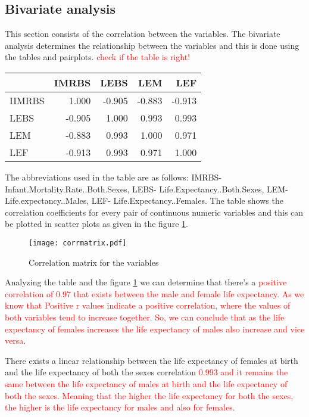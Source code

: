 \documentclass[12 pt]{scrartcl}
\newcommand{\red}{\textcolor{red}}
\begin{document}
	\subsection{Bivariate analysis}
	
	This section consists of the correlation between the variables. The bivariate analysis determines the relationship between the variables and this is done using the tables and pairplots.
	\red{ check if the table is right!}
	\begin{table}[ht]
		\centering
		\label{tab:corr_matrix}
		\begin{tabular}{l|rrrr}
			{} &  IMRBS &  LEBS & LEM &  LEF \\
			\hline
			IIMRBS &       1.000 &   -0.905 &   -0.883 &   -0.913 \\
			LEBS   &      -0.905 &    1.000 &    0.993 &   0.993 \\
			LEM    &      -0.883 &    0.993 &    1.000 &    0.971 \\
			LEF    &      -0.913 &    0.993 &    0.971 &   1.000 \\
			
		\end{tabular}
	\end{table}
	
	The abbreviations used in the table are as follows: IMRBS- Infant.Mortality.Rate..Both.Sexes, LEBS- Life.Expectancy..Both.Sexes, LEM- Life.expectancy..Males, LEF- Life.Expectancy..Females. The table  shows the correlation coefficients for every pair of continuous numeric variables and this can be plotted in scatter plots as given in the figure \ref{fig:pairplot}.
	
	\begin{figure}[h!]
		\centering
		\texttt{[image: corrmatrix.pdf]}
		\caption{Correlation matrix for the variables}
		\label{fig:pairplot}
	\end{figure}
	
	Analyzing the table  and the figure \ref{fig:pairplot} 
	we can determine that there's a \red{positive correlation of 0.97 that exists between the male and female life expectancy. As we know that Positive r values indicate a positive correlation, where the values of both variables tend to increase together. So, we can conclude that as the life expectancy of females increases the life expectancy of males also increase and vice versa}. 
	
	There exists a linear relationship between the life expectancy of females at birth and the life expectancy of both the sexes correlation \red{0.993 and it remains the same between the life expectancy of males at birth and the life expectancy of both the sexes. Meaning that the higher the life expectancy for both the sexes, the higher is the life expectancy for males and also for females}.  
	
\end{document}
